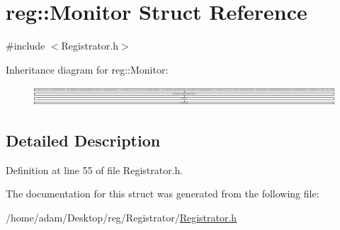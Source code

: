 \hypertarget{structreg_1_1_monitor}{}\section{reg\+:\+:Monitor Struct Reference}
\label{structreg_1_1_monitor}


{\ttfamily \#include $<$Registrator.\+h$>$}

Inheritance diagram for reg\+:\+:Monitor\+:\begin{figure}[H]
\begin{center}
\leavevmode
\includegraphics[height=0.732505cm]{structreg_1_1_monitor}
\end{center}
\end{figure}


\subsection{Detailed Description}


Definition at line 55 of file Registrator.\+h.



The documentation for this struct was generated from the following file\+:\begin{DoxyCompactItemize}
\item 
/home/adam/\+Desktop/reg/\+Registrator/\hyperlink{_registrator_8h}{Registrator.\+h}\end{DoxyCompactItemize}
